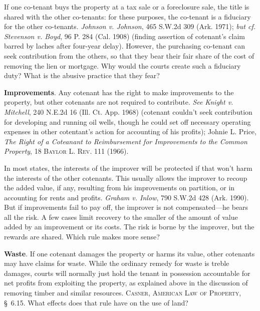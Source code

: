 If one co-tenant buys the property at a tax sale or a foreclosure sale, the
title is shared with the other co-tenants: for these purposes, the co-tenant is
a fiduciary for the other co-tenants. \emph{Johnson v. Johnson}, 465 S.W.2d 309
(Ark. 1971); \textit{but cf.} \emph{Stevenson v. Boyd}, 96 P. 284 (Cal. 1908)
(finding assertion of cotenant's claim barred by laches after four-year delay).
However, the purchasing co-tenant can seek contribution from the others, so that
they bear their fair share of the cost of removing the lien or mortgage. Why
would the courts create such a fiduciary duty? What is the abusive practice that
they fear?


\item \label{martin-improvements}\textbf{Improvements}. Any cotenant has the
right
to make improvements to the property, but other cotenants are not required to
contribute. \emph{See} \emph{Knight v. Mitchell}, 240 N.E.2d 16 (Ill. Ct. App.
1968) (cotenant couldn't seek contribution for developing and running oil wells,
though he could set off necessary operating expenses in other cotentant's action
for accounting of his profits); Johnie L. Price, \textit{The Right of a
Coteanant to Reimbursement for Improvements to the Common Property}, 18
\textsc{Baylor L. Rev}. 111 (1966).

In most states, the interests of the improver will be protected if that won't
harm the interests of the other cotenants. This usually allows the improver to
recoup the added value, if any, resulting from his improvements on partition, or
in accounting for rents and profits. \emph{Graham v. Inlow}, 790 S.W.2d 428
(Ark. 1990). But if improvements fail to pay off, the improver is not
compensated---he bears all the risk. A few cases limit recovery to the smaller
of the amount of value added by an improvement or its costs. The risk is borne
by the improver, but the rewards are shared. Which rule makes more sense?

\item \textbf{Waste}. If one cotenant damages the property or harms
its value, other cotenants may have claims for waste. While the ordinary
remedy for waste is treble damages, courts will normally just hold the tenant
in possession accountable for net profits from exploiting the property, as
explained above in the discussion of removing timber and similar resources.
\textsc{Casner, American Law of Property}, \S~6.15. What effects does that
rule have on the use of land?


